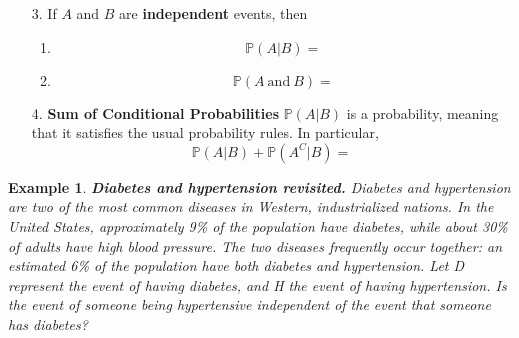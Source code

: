 \documentclass[12pt]{amsart}
\newtheorem{example}[theorem]{Example}
\begin{document}
{\begin{enumerate}
\item[3.] If $A$ and $B$ are \textbf{independent} events, then

\begin{enumerate}
\item 
$$\mathbb{P}(A|B) = $$

\vspace{2cm}
\item $$\mathbb{P}(A\ \mathrm{and}\  B)=$$
\end{enumerate}

	
\vspace{2cm}

\item[4.] \textbf{Sum of Conditional Probabilities}\newline 
$\mathbb{P}(A|B)$ is a probability, meaning that it satisfies the usual probability rules. In particular, 
	$$\mathbb{P}(A|B) + \mathbb{P}(A^C|B) = $$	

\end{enumerate}



\newpage


\begin{example}   \textbf{Diabetes and hypertension revisited.} \newline
Diabetes and hypertension are two of the most common diseases in Western, industrialized nations. In the United States, approximately 9\% of the population have diabetes, while about 30\% of adults have high blood pressure. The two diseases frequently occur together: an estimated 6\% of the population have both diabetes and hypertension. \newline
Let D represent the event of having diabetes, and H the event of having hypertension. 
Is the event of someone being hypertensive independent of the event that someone has diabetes?





\end{example}}
\end{document}

